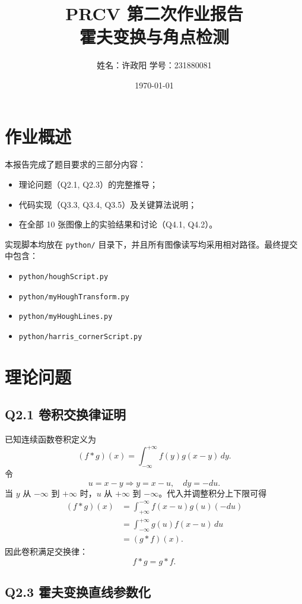 \documentclass[12pt,a4paper]{ctexart}
\title{PRCV 第二次作业报告\\霍夫变换与角点检测}
\author{姓名：许政阳 \quad 学号：231880081}
\date{\today}
\begin{document}
\maketitle
\tableofcontents
\newpage

\section{作业概述}
本报告完成了题目要求的三部分内容：
\begin{itemize}
    \item 理论问题（Q2.1, Q2.3）的完整推导；
    \item 代码实现（Q3.3, Q3.4, Q3.5）及关键算法说明；
    \item 在全部 10 张图像上的实验结果和讨论（Q4.1, Q4.2）。
\end{itemize}

实现脚本均放在 \texttt{python/} 目录下，并且所有图像读写均采用相对路径。最终提交中包含：
\begin{itemize}
    \item \texttt{python/houghScript.py}
    \item \texttt{python/myHoughTransform.py}
    \item \texttt{python/myHoughLines.py}
    \item \texttt{python/harris\_cornerScript.py}
\end{itemize}

\section{理论问题}
\subsection{Q2.1 卷积交换律证明}
已知连续函数卷积定义为
\begin{equation}
(f * g)(x) = \int_{-\infty}^{+\infty} f(y)g(x-y)\,dy.
\end{equation}
令
\[
u = x - y \Rightarrow y = x-u,\quad dy = -du.
\]
当 $y$ 从 $-\infty$ 到 $+\infty$ 时，$u$ 从 $+\infty$ 到 $-\infty$。代入并调整积分上下限可得
\begin{align}
(f * g)(x)
&= \int_{+\infty}^{-\infty} f(x-u)g(u)(-du) \\
&= \int_{-\infty}^{+\infty} g(u)f(x-u)\,du \\
&= (g * f)(x).
\end{align}
因此卷积满足交换律：
\[
f*g = g*f.
\]

\subsection{Q2.3 霍夫变换直线参数化}
\end{document}
